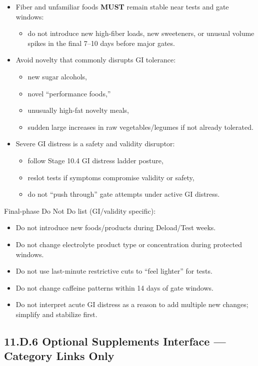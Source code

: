 \documentclass[10pt]{article}
\begin{document}
\begin{itemize}
\item Fiber and unfamiliar foods \textbf{MUST} remain stable near tests and gate windows:
\begin{itemize}
\item do not introduce new high-fiber loads, new sweeteners, or unusual volume spikes in the final 7–10 days before major gates.
\end{itemize}
\item Avoid novelty that commonly disrupts GI tolerance:
\begin{itemize}
\item new sugar alcohols,
\item novel “performance foods,”
\item unusually high-fat novelty meals,
\item sudden large increases in raw vegetables/legumes if not already tolerated.
\end{itemize}
\item Severe GI distress is a safety and validity disruptor:
\begin{itemize}
\item follow Stage 10.4 GI distress ladder posture,
\item reslot tests if symptoms compromise validity or safety,
\item do not “push through” gate attempts under active GI distress.
\end{itemize}
\end{itemize}

Final-phase Do Not Do list (GI/validity specific):

\begin{itemize}
\item Do not introduce new foods/products during Deload/Test weeks.
\item Do not change electrolyte product type or concentration during protected windows.
\item Do not use last-minute restrictive cuts to “feel lighter” for tests.
\item Do not change caffeine patterns within 14 days of gate windows.
\item Do not interpret acute GI distress as a reason to add multiple new changes; simplify and stabilize first.
\end{itemize}

\newpage

\subsection*{11.D.6 Optional Supplements Interface — Category Links Only}
{}
\end{document}
